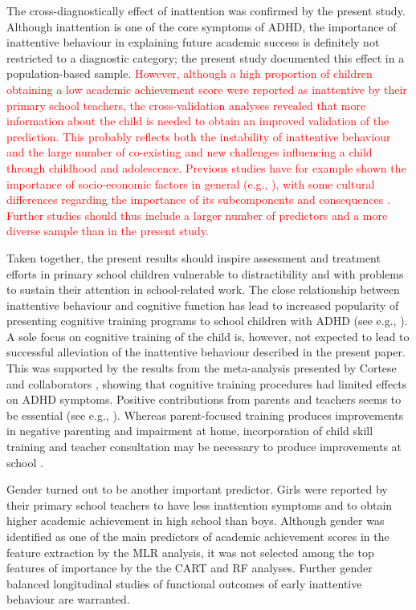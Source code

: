 \documentclass[10pt,letterpaper]{article}
\begin{document}
{{The cross-diagnostically effect of inattention was confirmed by the present study. Although  inattention is one of the core symptoms of ADHD,  the importance of inattentive behaviour in explaining future academic success is definitely not restricted to a diagnostic category; the present study documented this effect in a population-based sample.  \textcolor{red}{However, although a high proportion of children obtaining a low academic achievement score were reported as inattentive by their primary school teachers, the cross-validation analyses revealed that more information about the child is needed to obtain an improved validation of the prediction. This probably reflects both the instability of inattentive behaviour and the large number of co-existing and new challenges influencing a child through childhood and adolescence.  Previous studies have for example shown the  importance of socio-economic factors in general (e.g., \cite{Russel2015}), with some cultural differences regarding the importance of its subcomponents \cite{Boe2012} and consequences \cite{Ellertsen2016}. Further studies should thus include a larger number of predictors and a more diverse sample than in the present study. }

Taken together, the present results should inspire assessment and treatment efforts in primary school children vulnerable to distractibility and with problems to sustain their attention in school-related work. 
The close relationship between inattentive behaviour and cognitive function \cite{Berger2013, Berger2015} has lead to increased popularity of presenting cognitive training programs to school children with ADHD (see e.g., \cite{Rapport2013, Tamm2017}). A sole focus on cognitive training of the child is, however, not expected to lead to successful alleviation of the inattentive behaviour described in the present paper. This was supported by the results from the meta-analysis presented by Cortese and collaborators  \cite{Cortese2015}, showing that cognitive training procedures had limited effects on ADHD symptoms. Positive contributions from parents and teachers seems to be essential (see e.g., \cite{Pfiffner2014}). Whereas parent-focused training produces improvements in negative parenting and impairment at home, incorporation of child skill training and teacher consultation may be necessary to produce improvements at school \cite{Haack2016}. 

Gender turned out to be another important predictor. Girls were reported by their primary school teachers to have less inattention symptoms and to obtain higher academic achievement in high school than boys.  Although gender was identified as one of the main predictors of academic achievement scores in the feature extraction by the MLR analysis, it was not selected among the top features of importance by the the CART and RF analyses.  Further gender balanced longitudinal studies of functional outcomes of early inattentive behaviour are warranted. \\

}}
\end{document}
